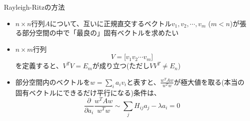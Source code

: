 \begin{frame}[t,fragile]{Rayleigh-Ritzの方法}
  \begin{itemize}
  \item $n \times n$行列$A$について、互いに正規直交するベクトル$v_1,v_2,\cdots,v_m$ ($m < n$)が張る部分空間の中で「最良の」固有ベクトルを求めたい
  \item $n \times m$行列
    \[
    V=\big[v_1 v_2 \cdots v_m\big]
    \]
    を定義すると、$V^TV=E_m$が成り立つ(ただし$VV^T \ne E_n$)
  \item 部分空間内のベクトルを$w = \sum_i a_i v_i$と表すと、$\displaystyle \frac{w^TAw}{w^Tw}$が極大値を取る(本当の固有ベクトルにできるだけ平行になる)条件は、
    \[
    \frac{\partial}{\partial a_i} \frac{w^TAw}{w^Tw} \sim \sum_j H_{ij}a_j - \lambda a_i = 0
    \]
  \end{itemize}
\end{frame}
